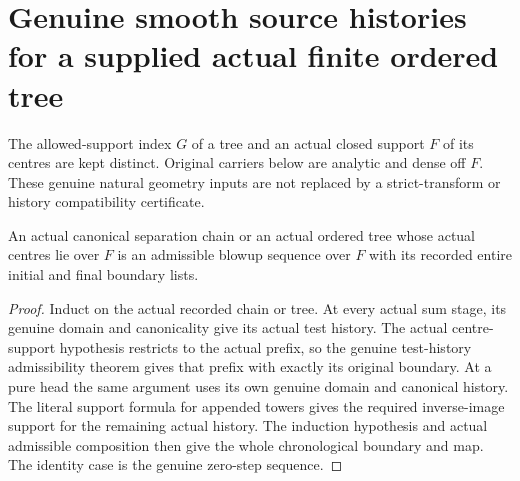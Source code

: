 \section{Genuine smooth source histories for a supplied actual finite ordered tree}

The allowed-support index $G$ of a tree and an actual closed support
$F$ of its centres are kept distinct. Original carriers below are
analytic and dense off $F$. These genuine natural geometry inputs are
not replaced by a strict-transform or history compatibility certificate.

\begin{lemma}
\label{hir:original-actual-ordered-tree-admissibility}
\leanok
An actual canonical separation chain or an actual ordered tree whose
actual centres lie over $F$ is an admissible blowup sequence over $F$
with its recorded entire initial and final boundary lists.
\end{lemma}
\begin{proof}
Induct on the actual recorded chain or tree. At every actual sum stage,
its genuine domain and canonicality give its actual test history.
The actual centre-support hypothesis restricts to the actual prefix,
so the genuine test-history admissibility theorem gives that prefix
with exactly its original boundary. At a pure head the same argument
uses its own genuine domain and canonical history. The literal support
formula for appended towers gives the required inverse-image support
for the remaining actual history. The induction hypothesis and actual
admissible composition then give the whole chronological boundary and
map. The identity case is the genuine zero-step sequence.
\end{proof}

